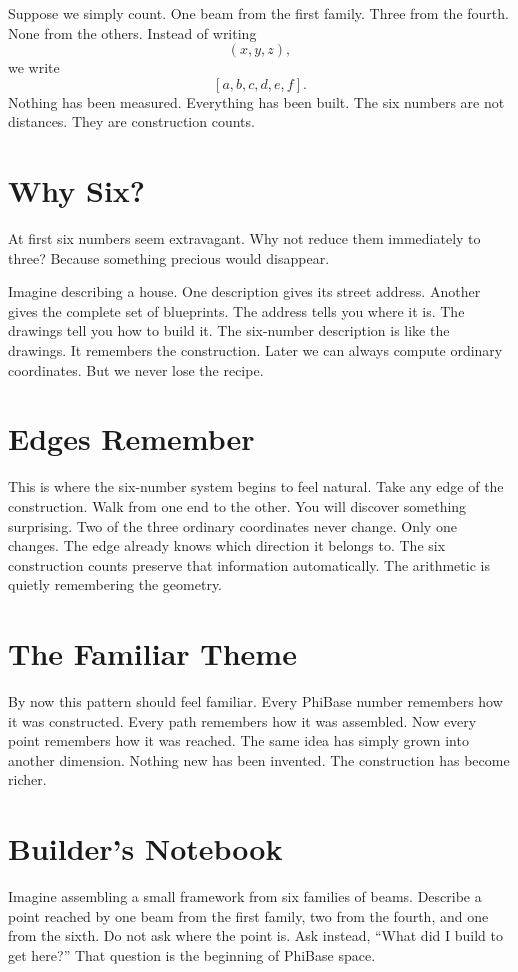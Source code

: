 Suppose we simply count. One beam from the first family. Three from the fourth. None from the others. Instead of writing
\[
(x,y,z),
\]
we write
\[
[a,b,c,d,e,f].
\]
Nothing has been measured. Everything has been built. The six numbers are not distances. They are construction counts.

\section*{Why Six?}

At first six numbers seem extravagant. Why not reduce them immediately to three? Because something precious would disappear.

Imagine describing a house. One description gives its street address. Another gives the complete set of blueprints. The address tells you where it is. The drawings tell you how to build it. The six-number description is like the drawings. It remembers the construction. Later we can always compute ordinary coordinates. But we never lose the recipe.

\section*{Edges Remember}

This is where the six-number system begins to feel natural. Take any edge of the construction. Walk from one end to the other. You will discover something surprising. Two of the three ordinary coordinates never change. Only one changes. The edge already knows which direction it belongs to. The six construction counts preserve that information automatically. The arithmetic is quietly remembering the geometry.

\section*{The Familiar Theme}

By now this pattern should feel familiar. Every PhiBase number remembers how it was constructed. Every path remembers how it was assembled. Now every point remembers how it was reached. The same idea has simply grown into another dimension. Nothing new has been invented. The construction has become richer.

\section*{Builder's Notebook}

Imagine assembling a small framework from six families of beams. Describe a point reached by one beam from the first family, two from the fourth, and one from the sixth. Do not ask where the point is. Ask instead, ``What did I build to get here?'' That question is the beginning of PhiBase space.

